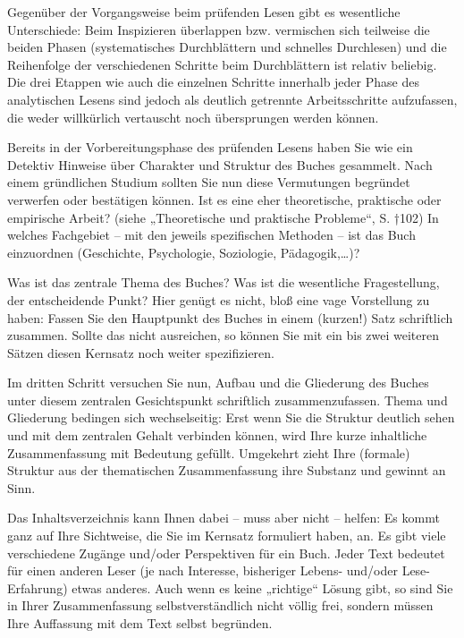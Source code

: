 \documentclass[]{book}
\theoremstyle{definition}
\theoremstyle{definition}
\theoremstyle{definition}
\theoremstyle{remark}
\begin{document}
Gegenüber der Vorgangsweise beim prüfenden Lesen gibt es wesentliche
Unterschiede: Beim Inspizieren überlappen bzw. vermischen sich teilweise
die beiden Phasen (systematisches Durchblättern und schnelles
Durchlesen) und die Reihenfolge der verschiedenen Schritte beim
Durchblättern ist relativ beliebig. Die drei Etappen wie auch die
einzelnen Schritte innerhalb jeder Phase des analytischen Lesens sind
jedoch als deutlich getrennte Arbeitsschritte aufzufassen, die weder
willkürlich vertauscht noch übersprungen werden können.

Bereits in der Vorbereitungsphase des prüfenden Lesens haben Sie wie ein
Detektiv Hinweise über Charakter und Struktur des Buches gesammelt. Nach
einem gründlichen Studium sollten Sie nun diese Vermutungen begründet
verwerfen oder bestätigen können. Ist es eine eher theoretische,
praktische oder empirische Arbeit? (siehe „Theoretische und praktische
Probleme``, S. †102) In welches Fachgebiet -- mit den jeweils
spezifischen Methoden -- ist das Buch einzuordnen (Geschichte,
Psychologie, Soziologie, Pädagogik,\ldots{})?

Was ist das zentrale Thema des Buches? Was ist die wesentliche
Fragestellung, der entscheidende Punkt? Hier genügt es nicht, bloß eine
vage Vorstellung zu haben: Fassen Sie den Hauptpunkt des Buches in einem
(kurzen!) Satz schriftlich zusammen. Sollte das nicht ausreichen, so
können Sie mit ein bis zwei weiteren Sätzen diesen Kernsatz noch weiter
spezifizieren.

Im dritten Schritt versuchen Sie nun, Aufbau und die Gliederung des
Buches unter diesem zentralen Gesichtspunkt schriftlich
zusammenzufassen. Thema und Gliederung bedingen sich wechselseitig: Erst
wenn Sie die Struktur deutlich sehen und mit dem zentralen Gehalt
verbinden können, wird Ihre kurze inhaltliche Zusammenfassung mit
Bedeutung gefüllt. Umgekehrt zieht Ihre (formale) Struktur aus der
thematischen Zusammenfassung ihre Substanz und gewinnt an Sinn.

Das Inhaltsverzeichnis kann Ihnen dabei -- muss aber nicht -- helfen: Es
kommt ganz auf Ihre Sichtweise, die Sie im Kernsatz formuliert haben,
an. Es gibt viele verschiedene Zugänge und/oder Perspektiven für ein
Buch. Jeder Text bedeutet für einen anderen Leser (je nach Interesse,
bisheriger Lebens- und/oder Lese-Erfahrung) etwas anderes. Auch wenn es
keine „richtige`` Lösung gibt, so sind Sie in Ihrer Zusammenfassung
selbstverständlich nicht völlig frei, sondern müssen Ihre Auffassung mit
dem Text selbst begründen.
\end{document}
